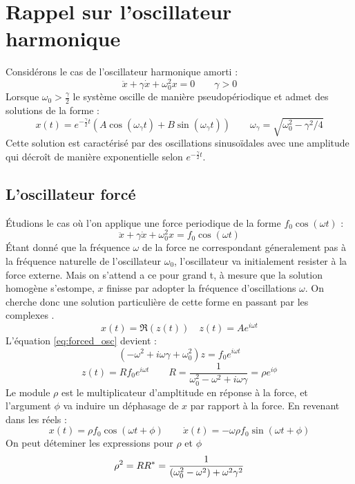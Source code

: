 \chapter{Rappel sur l'oscillateur harmonique}
%
Considérons le cas de l'oscillateur harmonique amorti :
\begin{dmath}
    \ddot{x} + \gamma\dot{x} + \omega_0^2 x = 0
    \qquad {\gamma > 0}
\end{dmath}   
%
Lorsque $\omega_0 > \frac{\gamma}{2}$ le système oscille de manière pseudopériodique et admet des solutions de la forme :
%
\begin{dmath}
    x(t) = e^{-\frac{\gamma}{2}t}(A\cos(\omega_{\gamma} t) + B\sin(\omega_{\gamma} t))
    \qquad {\omega_{\gamma} = \sqrt{\omega_0^2 - \gamma^2/4}}
\end{dmath}
%
Cette solution est caractérisé par des oscillations sinusoïdales avec une amplitude qui décroît de manière exponentielle selon $e^{-\frac{\gamma}{2} t}$.
%
\section{L'oscillateur forcé}
%
Étudions le cas où l’on applique une force periodique de la forme $f_0\cos(\omega t)$ :
%
\begin{dmath}
    \ddot{x} + \gamma\dot{x} + \omega_0^2 x = f_0\cos(\omega t)
    \label{eq:forced_osc}
\end{dmath}
%
Étant donné que la fréquence $\omega$ de la force ne correspondant 
géneralement pas à la fréquence naturelle de l'oscillateur $\omega_0$, 
l'oscillateur va initialement resister à la force externe.
Mais on s'attend a ce pour grand t, à mesure que la solution homogène s'estompe, $x$ finisse par adopter la 
fréquence d'oscillations $\omega$. 
On cherche donc une solution particulière de cette forme en passant 
par les complexes \cite{feynman_feynman_nodate}.
%
\begin{equation}
    x(t) = \Re(z(t)) \quad z(t) = Ae^{i\omega t}
\end{equation}
%
L'équation \eqref{eq:forced_osc} devient :
%
\begin{equation}
    (-\omega^2 + i\omega\gamma + \omega_0^2)z = f_0 e^{i\omega t}
\end{equation}
%
\begin{equation}
    z(t) = R f_0 e^{i \omega t} \qquad R = \frac{1}{\omega_0^2 - \omega^2 + i\omega\gamma} = \rho e^{i\phi}
\end{equation}
%
Le module $\rho$ est le multiplicateur d’ampltitude en réponse à la force, et l’argument $\phi$ va induire un déphasage de $x$ par rapport à la force.
%
En revenant dans les réels :
\begin{equation}
    x(t) = \rho f_0 \cos(\omega t + \phi)
    \qquad \dot{x}(t) = -\omega \rho f_0 \sin(\omega t + \phi)
\end{equation}
%
On peut déteminer les expressions pour $\rho$ et $\phi$
%
\begin{dmath}
    \rho^2 = RR^* \\
    = \frac{1}{(\omega_0^2 - \omega^2) + \omega^2\gamma^2}
\end{dmath}

